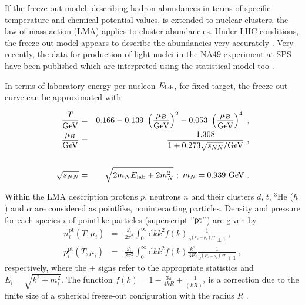 \documentclass[epj]{svjour}
\begin{document}
If the freeze-out model, describing hadron abundances in terms of specific temperature and chemical potential values, is extended to nuclear clusters, the law of mass action (LMA) \cite{DasGupta:1981xx} 
applies to cluster abundancies.
Under LHC conditions, the freeze-out model 
\cite{Andronic:2010qu,Cleymans:2011pe,Andronic:2011yq}
appears to describe the abundancies very accurately
\cite{Adam:2015vda}.
Very recently, the data for production of light nuclei in the NA49 experiment at SPS have been published which are interpreted using the statistical model too \cite{Anticic:2016ckv}.  
  
In terms of laboratory energy per nucleon $E_{\rm lab}$, for fixed target, the freeze-out curve can be approximated with \cite{Begun:2012rf}

\begin{eqnarray}
\label{freezeout}
\frac{T}{{\rm GeV}} &=& 0.166 - 0.139~\left(\frac{\mu_B}{{\rm GeV}}\right)^2 
                                         - 0.053~\left(\frac{\mu_B}{{\rm GeV}}\right)^4 ~,\nonumber\\
\frac{\mu_B}{{\rm GeV}} &=& \frac{1.308}{1+0.273\sqrt{s_{NN}}/{\rm GeV}}~,\\
\nonumber\\
\sqrt{s_{NN}}&=&\sqrt{2m_N E_{\rm lab} +2m_N^2}~;~m_N=0.939~{\rm GeV}~.\nonumber
\end{eqnarray}

Within the LMA description 
protons $p$, neutrons $n$ and their
clusters $d$, $t$, $^3$He ($h$) and $\alpha$ are considered as pointlike, noninteracting particles.
Density and pressure for each species $i$ of pointlike particles (superscript $"{\rm pt}"$)
are given by
\begin{eqnarray*}
	n^\mathrm{pt}_i (T, \mu_i) &=& \frac{g_i}{2\pi^2} \int_0^\infty \mathrm dk k^2 f(k) 
	\frac{1}{\mathrm e^{(E_i - \mu_i)/T} \pm 1}~,
\\	p^\mathrm{pt}_i (T, \mu_i) &=& \frac{g_i}{2\pi^2} \int_0^\infty \mathrm dk k^2 f(k) 
\frac{k^2}{3E_i}\frac{1}{\mathrm e^{(E_i - \mu_i)/T} \pm 1}~,
\end{eqnarray*}
respectively, where the $\pm$ signs refer to the appropriate statistics and $E_i=\sqrt{k^2+m_i^2}$.
The function $f(k) = 1 - \frac{3\pi}{4kR} + \frac{1}{(kR)^2}$ 
is a correction due to the finite size of a spherical freeze-out configuration with the radius $R$ 
\cite{BraunMunzinger:1995bp}.
\end{document}
